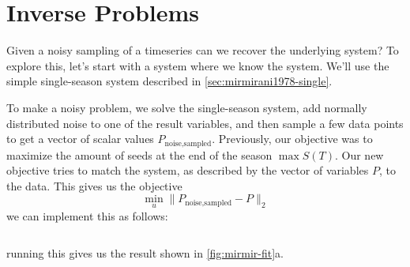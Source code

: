\documentclass{article}
\begin{document}

\section{Inverse Problems}
\label{sec:inverse_problem_mirmir}

Given a noisy sampling of a timeseries can we recover the underlying system? To explore this, let's start with a system where we know the system. We'll use the simple single-season system described in \autoref{sec:mirmirani1978-single}.

To make a noisy problem, we solve the single-season system, add normally distributed noise to one of the result variables, and then sample a few data points to get a vector of scalar values $P_\textrm{noise,sampled}$. Previously, our objective was to maximize the amount of seeds at the end of the season $\max S(T)$. Our new objective tries to match the system, as described by the vector of variables $P$, to the data. This gives us the objective
\begin{equation}
\min_u \lVert P_\textrm{noise,sampled} - P \rVert_2
\end{equation}
we can implement this as follows:
\inputminted[firstline=12,lastline=26,frame=single,linenos]{python}{src/MirmiraniOster1978_inverse_problem.py}
running this gives us the result shown in \autoref{fig:mirmir-fit}a.
\end{document}
